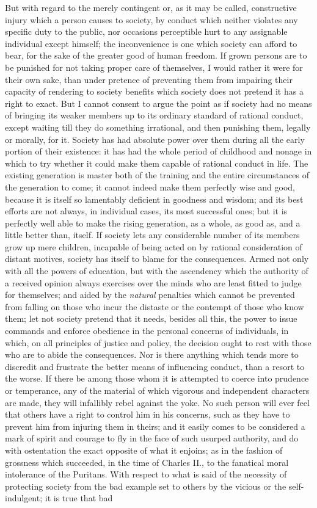 \documentclass[12pt]{report}
\begin{document}
But with regard to the merely contingent or, as it may be called, constructive injury which a person causes to society, by conduct which neither violates any specific duty to the public, nor occasions perceptible hurt to any assignable individual except himself; the inconvenience is one which society can afford to bear, for the sake of the greater good of human freedom. If grown persons are to be punished for not taking proper care of themselves, I would rather it were for their own sake, than under pretence of preventing them from impairing their capacity of rendering to society benefits which society does not pretend it has a right to exact. But I cannot consent to argue the point as if society had no means of bringing its weaker members up to its ordinary standard of rational conduct, except waiting till they do something irrational, and then punishing them, legally or morally, for it. Society has had absolute power over them during all the early portion of their existence: it has had the whole period of childhood and nonage in which to try whether it could make them capable of rational conduct in life. The existing generation is master both of the training and the entire circumstances of the generation to come; it cannot indeed make them perfectly wise and good, because it is itself so lamentably deficient in goodness and wisdom; and its best efforts are not always, in individual cases, its most successful ones; but it is perfectly well able to make the rising generation, as a whole, as good as, and a little better than, itself. If society lets any considerable number of its members grow up mere children, incapable of being acted on by rational consideration of distant motives, society has itself to blame for the consequences. Armed not only with all the powers of education, but with the ascendency which the authority of a received opinion always exercises over the minds who are least fitted to judge for themselves; and aided by the \emph{natural} penalties which cannot be prevented from falling on those who incur the distaste or the contempt of those who know them; let not society pretend that it needs, besides all this, the power to issue commands and enforce obedience in the personal concerns of individuals, in which, on all principles of justice and policy, the decision ought to rest with those who are to abide the consequences. Nor is there anything which tends more to discredit and frustrate the better means of influencing conduct, than a resort to the worse. If there be among those whom it is attempted to coerce into prudence or temperance, any of the material of which vigorous and independent characters are made, they will infallibly rebel against the yoke. No such person will ever feel that others have a right to control him in his concerns, such as they have to prevent him from injuring them in theirs; and it easily comes to be considered a mark of spirit and courage to fly in the face of such usurped authority, and do with ostentation the exact opposite of what it enjoins; as in the fashion of grossness which succeeded, in the time of Charles II., to the fanatical moral intolerance of the Puritans. With respect to what is said of the necessity of protecting society from the bad example set to others by the vicious or the self-indulgent; it is true that bad 
\end{document}
